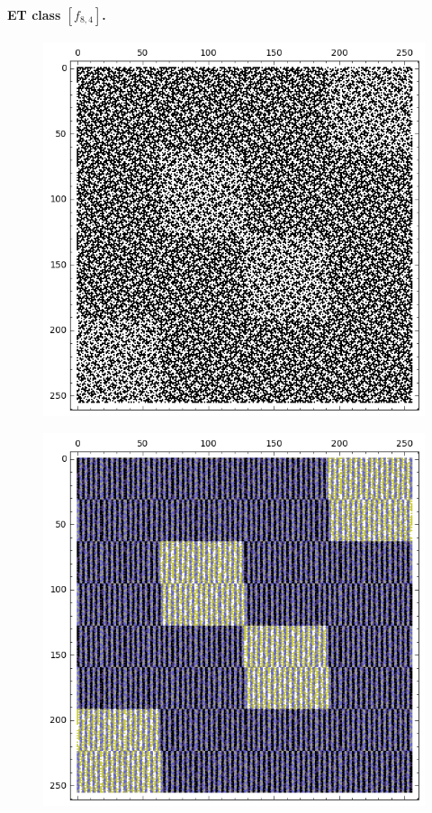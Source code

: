\documentclass[12pt,a4paper]{article}
\begin{document}
\paragraph*{ET class $[f_{8,4}]$.}
\begin{figure}[!hb]
\centering
\begin{minipage}{.48\textwidth}
  \centering
  \includegraphics[width=.9\linewidth]{../matrix_plot/re8_4_weight_class_matrix.png}
  \label{fig:8_4_weight_class_matrix}
\end{minipage}%
\begin{minipage}{.48\textwidth}
  \centering
  \includegraphics[width=.9\linewidth]{../matrix_plot/re8_4_bent_cayley_graph_index_matrix.png}
  \label{fig:8_4_bent_cayley_graph_index_matrix}
\end{minipage}
\end{figure}
~
\end{document}
